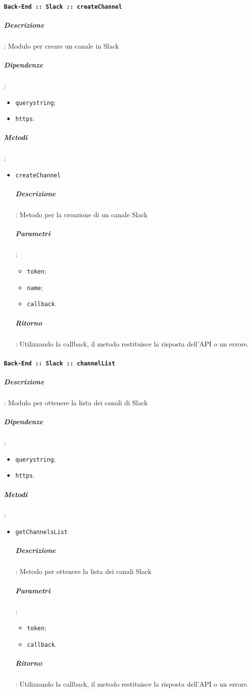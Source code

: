 \documentclass[../DefinizioneDiProdotto_v2.0.0.tex]{subfiles}
\begin{document}
\paragraph{\texttt{Back-End :: Slack :: createChannel}}
\subparagraph{Descrizione}: Modulo per creare un canale in Slack
\subparagraph{Dipendenze}:
\begin{itemize}
	\item \texttt{querystring};
	\item \texttt{https}.
\end{itemize}
\subparagraph{Metodi}:
\begin{itemize}
	\item \texttt{createChannel}
	      \subparagraph{Descrizione}: Metodo per la creazione di un canale Slack
	      \subparagraph{Parametri}:
	      \begin{itemize}
	      	\item \texttt{token};
	      	\item \texttt{name};
	      	\item \texttt{callback}.
	      \end{itemize}
	      \subparagraph{Ritorno}: Utilizzando la callback, il metodo restituisce la risposta dell'API o un errore.
\end{itemize}

\paragraph{\texttt{Back-End :: Slack :: channelList}}
\subparagraph{Descrizione}: Modulo per ottenere la lista dei canali di Slack
\subparagraph{Dipendenze}:
\begin{itemize}
	\item \texttt{querystring};
	\item \texttt{https}.
\end{itemize}
\subparagraph{Metodi}:
\begin{itemize}
	\item \texttt{getChannelsList}
	      \subparagraph{Descrizione}: Metodo per ottenere la lista dei canali Slack
	      \subparagraph{Parametri}:
	      \begin{itemize}
	      	\item \texttt{token};
	      	\item \texttt{callback}.
	      \end{itemize}
	      \subparagraph{Ritorno}: Utilizzando la callback, il metodo restituisce la risposta dell'API o un errore.
\end{itemize}
\end{document}
